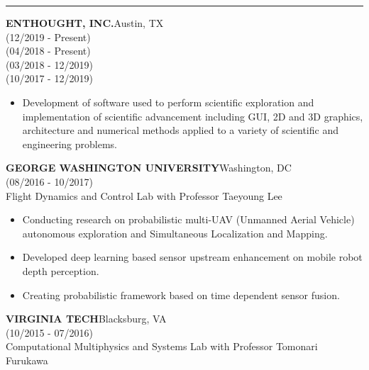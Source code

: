 \documentclass[11pt,letterpaper]{article}
\newcommand{\sect}[1]{\vspace{2mm}{\centering {\bf \large \scshape \uppercase{#1}} \par}  {\color{blue} \vskip 2mm \hrule height 1pt}\vspace{2mm}}
\begin{document}
  \sect{appointments}
   \MakeUppercase{\bf Enthought, Inc.}\hfill{Austin, TX}\\
  \hfill {(12/2019 - Present)}\\
  \hfill {(04/2018 - Present)}\\
  \hfill {(03/2018 - 12/2019)}\\
  \hfill {(10/2017 - 12/2019)}\\
  \begin{itemize}
  	\item Development of software used to perform scientific exploration and implementation of scientific advancement including GUI, 2D and 3D graphics, architecture and numerical methods applied to a variety of scientific and engineering problems.
  \end{itemize}
  \MakeUppercase{\bf George Washington University}\hfill{Washington, DC}\\
  \hfill {(08/2016 - 10/2017)}\\
  Flight Dynamics and Control Lab with Professor Taeyoung Lee\\
  \begin{itemize}
    \item Conducting research on probabilistic multi-UAV (Unmanned Aerial Vehicle) autonomous exploration and Simultaneous Localization and Mapping.
    \item Developed deep learning based sensor upstream enhancement on mobile robot depth perception.
    \item Creating probabilistic framework based on time dependent sensor fusion.
  \end{itemize}
  \MakeUppercase{\bf Virginia Tech}\hfill{Blacksburg, VA }\\
  \hfill {(10/2015 - 07/2016)}\\
  Computational Multiphysics and Systems Lab with Professor Tomonari Furukawa\\
\end{document}

